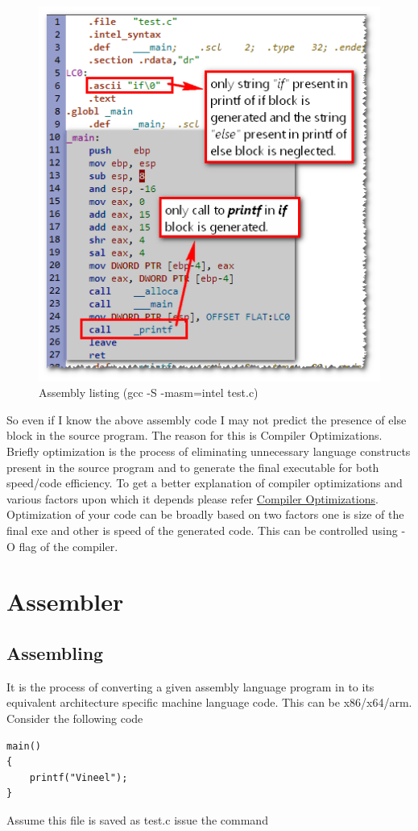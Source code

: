\documentclass{article}
\begin{document}
\begin{figure}[H]
\centering
\includegraphics[width=\textwidth]{Compilation3.png}
\caption{Assembly listing (gcc -S -masm=intel test.c)}
\end{figure}
So even if I know the above assembly code I may not predict the presence of else block in the source program. The reason for this is Compiler Optimizations. Briefly optimization is the process of eliminating unnecessary language constructs present in the source program and to generate the final executable for both speed/code efficiency. To get a better explanation of compiler optimizations and various factors upon which it depends please refer \href{''https://en.wikipedia.org/wiki/Optimizing_compiler''}{Compiler Optimizations}. Optimization of your code can be broadly based on two factors one is size of the final exe and other is speed of the generated code. This can be controlled using -O flag of the compiler.
\section{Assembler}
\subsection{Assembling}
It is the process of converting a given assembly language program in to its equivalent architecture specific machine language code. This can be x86/x64/arm. Consider the following code
\begin{verbatim}
main()
{
    printf("Vineel");
}
\end{verbatim}
Assume this file is saved as test.c issue the command
\end{document}
